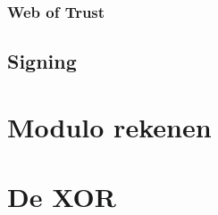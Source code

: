 \documentclass[a4paper,12pt,twoside,openright,titlepage]{book}
\begin{document}
\subsection{Web of Trust}

\section{Signing}


\begin{appendices}
	\chapter{Modulo rekenen}\label{chap:modulo}

	\chapter{De XOR}\label{chap:xor}

\end{appendices}

\printindex
\end{document}
